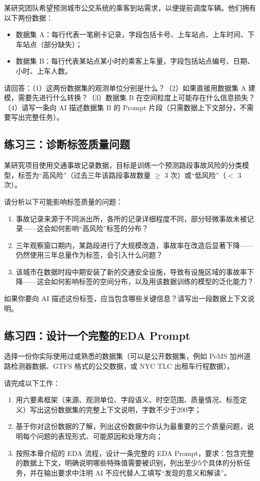 某研究团队希望预测城市公交系统的乘客到站需求，以便提前调度车辆。他们拥有以下两份数据：

\begin{itemize}
  \item 数据集 A：每行代表一笔刷卡记录，字段包括卡号、上车站点、上车时间、下车站点（部分缺失）；
  \item 数据集 B：每行代表某站点某小时的乘客上车量，字段包括站点编号、日期、小时、上车人数。
\end{itemize}

请回答：（1）这两份数据集的观测单位分别是什么？（2）如果直接用数据集 A 建模，需要先进行什么转换？（3）数据集 B 在空间粒度上可能存在什么信息损失？（4）请写一条向 AI 描述数据集 B 的 Prompt 片段（只需数据上下文部分，不需要写出完整任务）。

\subsection*{练习三：诊断标签质量问题}

某研究项目使用交通事故记录数据，目标是训练一个预测路段事故风险的分类模型，标签为“高风险”（过去三年该路段事故数量 $\geq$ 3 次）或“低风险”（$<$ 3 次）。

请分析以下可能影响标签质量的问题：

\begin{enumerate}
  \item 事故记录来源于不同派出所，各所的记录详细程度不同，部分轻微事故未被记录——这会如何影响“高风险”标签的分布？
  \item 三年观察窗口期内，某路段进行了大规模改造，事故率在改造后显著下降——仍然使用三年总量作为标签，会引入什么问题？
  \item 该城市在数据时段中期安装了新的交通安全设施，导致有设施区域的事故率下降——这会如何影响标签的空间分布，以及用该数据训练的模型的泛化能力？
\end{enumerate}

如果你要向 AI 描述这份标签，应当包含哪些关键信息？请写出一段数据上下文说明。

\subsection*{练习四：设计一个完整的EDA Prompt}

选择一份你实际使用过或熟悉的数据集（可以是公开数据集，例如 PeMS 加州道路检测器数据、GTFS 格式的公交数据，或 NYC TLC 出租车行程数据）。

请完成以下工作：

\begin{enumerate}
  \item 用六要素框架（来源、观测单位、字段语义、时空范围、质量情况、标签定义）写出这份数据集的完整上下文说明，字数不少于200字；
  \item 基于你对这份数据的了解，列出这份数据中你认为最重要的三个质量问题，说明每个问题的表现形式、可能原因和处理方向；
  \item 按照本章介绍的 EDA 流程，设计一条完整的 EDA Prompt，要求：包含完整的数据上下文，明确说明哪些特殊值需要被识别，列出至少5个具体的分析任务，并在输出要求中注明 AI 不应代替人工填写“发现的意义和解读”。
\end{enumerate}





